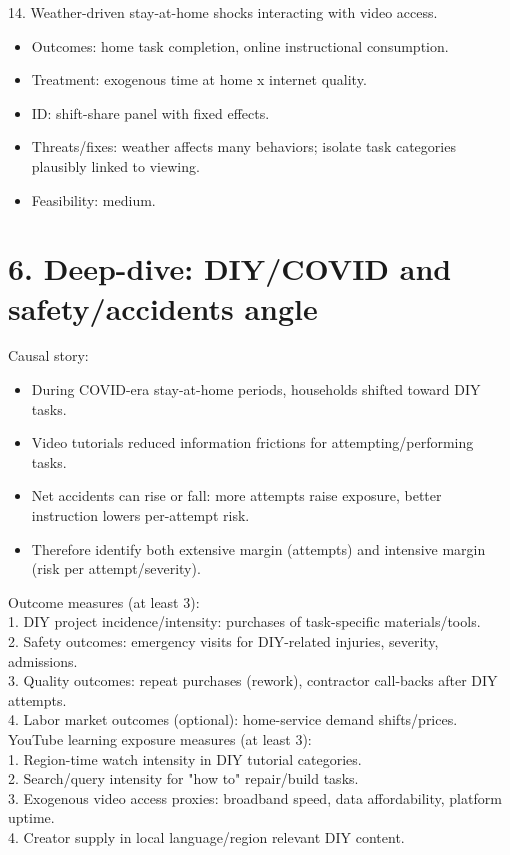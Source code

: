 \documentclass[11pt]{article}
\begin{document}
14. Weather-driven stay-at-home shocks interacting with video access.\\
\begin{itemize}
\item Outcomes: home task completion, online instructional consumption.
\item Treatment: exogenous time at home x internet quality.
\item ID: shift-share panel with fixed effects.
\item Threats/fixes: weather affects many behaviors; isolate task categories plausibly linked to viewing.
\item Feasibility: medium.
\end{itemize}

\section*{6. Deep-dive: DIY/COVID and safety/accidents angle}
Causal story:\\
\begin{itemize}
\item During COVID-era stay-at-home periods, households shifted toward DIY tasks.
\item Video tutorials reduced information frictions for attempting/performing tasks.
\item Net accidents can rise or fall: more attempts raise exposure, better instruction lowers per-attempt risk.
\item Therefore identify both extensive margin (attempts) and intensive margin (risk per attempt/severity).
\end{itemize}

Outcome measures (at least 3):\\
1. DIY project incidence/intensity: purchases of task-specific materials/tools.\\
2. Safety outcomes: emergency visits for DIY-related injuries, severity, admissions.\\
3. Quality outcomes: repeat purchases (rework), contractor call-backs after DIY attempts.\\
4. Labor market outcomes (optional): home-service demand shifts/prices.\\

YouTube learning exposure measures (at least 3):\\
1. Region-time watch intensity in DIY tutorial categories.\\
2. Search/query intensity for "how to" repair/build tasks.\\
3. Exogenous video access proxies: broadband speed, data affordability, platform uptime.\\
4. Creator supply in local language/region relevant DIY content.\\
\end{document}
